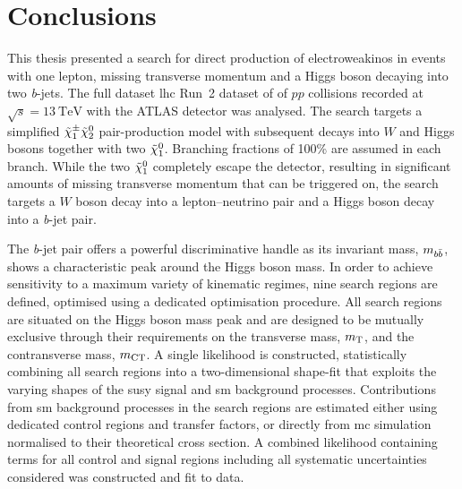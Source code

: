

\chapter{Conclusions}

\ifpdf
    \graphicspath{{chapter-summary/Figs/Raster/}{chapter-summary/Figs/PDF/}{chapter-summary/Figs/}}
\else
    \graphicspath{{chapter-summary/Figs/Vector/}{chapter-summary/Figs/}}
\fi


This thesis presented a search for direct production of electroweakinos in events with one lepton, missing transverse momentum and a Higgs boson decaying into two \textit{b}-jets. The full dataset \gls{lhc} Run~2 dataset of \onethirtynineifb of $pp$ collisions recorded at $\sqrt{s} = \SI{13}{\TeV}$ with the ATLAS detector was analysed. The search targets a simplified $\tilde{\chi}_1^\pm\tilde{\chi}_2^0$ pair-production model with subsequent decays into $W$ and Higgs bosons together with two $\tilde{\chi}_1^0$. Branching fractions of 100\% are assumed in each branch. While the two $\tilde{\chi}_1^0$ completely escape the detector, resulting in significant amounts of missing transverse momentum that can be triggered on, the search targets a $W$ boson decay into a lepton--neutrino pair and a Higgs boson decay into a \textit{b}-jet pair.

The \textit{b}-jet pair offers a powerful discriminative handle as its invariant mass, $m_{b\bar{b}}$, shows a characteristic peak around the Higgs boson mass. In order to achieve sensitivity to a maximum variety of kinematic regimes, nine search regions are defined, optimised using a dedicated optimisation procedure. All search regions are situated on the Higgs boson mass peak and are designed to be mutually exclusive through their requirements on the transverse mass, $m_{\textrm{T}}$, and the contransverse mass, $m_{\textrm{CT}}$. A single likelihood is constructed, statistically combining all search regions into a two-dimensional shape-fit that exploits the varying shapes of the \gls{susy} signal and \gls{sm} background processes. Contributions from \gls{sm} background processes in the search regions are estimated either using dedicated control regions and transfer factors, or directly from \gls{mc} simulation normalised to their theoretical cross section. A combined likelihood containing terms for all control and signal regions including all systematic uncertainties considered was constructed and fit to data. 

